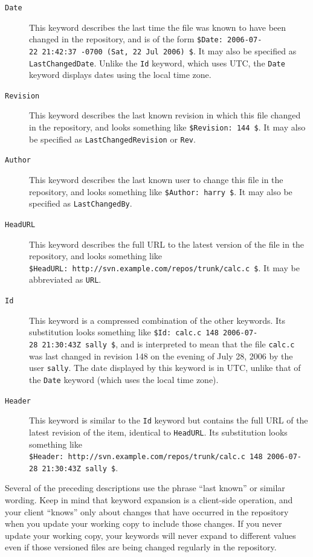 \begin{description}
\item[\texttt{Date}]
This keyword describes the last time the file was known to have been
changed in the repository, and is of the form
\texttt{\$Date:\ 2006-07-22\ 21:42:37\ -0700\ (Sat,\ 22\ Jul\ 2006)\ \$}.
It may also be specified as \texttt{LastChangedDate}. Unlike the
\texttt{Id} keyword, which uses UTC, the \texttt{Date} keyword displays
dates using the local time zone.
\item[\texttt{Revision}]
This keyword describes the last known revision in which this file
changed in the repository, and looks something like
\texttt{\$Revision:\ 144\ \$}. It may also be specified as
\texttt{LastChangedRevision} or \texttt{Rev}.
\item[\texttt{Author}]
This keyword describes the last known user to change this file in the
repository, and looks something like \texttt{\$Author:\ harry\ \$}. It
may also be specified as \texttt{LastChangedBy}.
\item[\texttt{HeadURL}]
This keyword describes the full URL to the latest version of the file in
the repository, and looks something like
\texttt{\$HeadURL:\ http://svn.example.com/repos/trunk/calc.c\ \$}. It
may be abbreviated as \texttt{URL}.
\item[\texttt{Id}]
This keyword is a compressed combination of the other keywords. Its
substitution looks something like
\texttt{\$Id:\ calc.c\ 148\ 2006-07-28\ 21:30:43Z\ sally\ \$}, and is
interpreted to mean that the file \texttt{calc.c} was last changed in
revision 148 on the evening of July 28, 2006 by the user \texttt{sally}.
The date displayed by this keyword is in UTC, unlike that of the
\texttt{Date} keyword (which uses the local time zone).
\item[\texttt{Header}]
This keyword is similar to the \texttt{Id} keyword but contains the full
URL of the latest revision of the item, identical to \texttt{HeadURL}.
Its substitution looks something like
\texttt{\$Header:\ http://svn.example.com/repos/trunk/calc.c\ 148\ 2006-07-28\ 21:30:43Z\ sally\ \$}.
\end{description}

Several of the preceding descriptions use the phrase ``last known'' or
similar wording. Keep in mind that keyword expansion is a client-side
operation, and your client ``knows'' only about changes that have
occurred in the repository when you update your working copy to include
those changes. If you never update your working copy, your keywords will
never expand to different values even if those versioned files are being
changed regularly in the repository.

